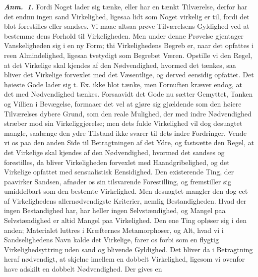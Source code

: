 \documentclass[12pt]{book}
\newcommand{\anm}[1]{\emph{\textbf{Anm.~#1.}}}
\newcommand{\opage}[1]{\marginnote{\footnotesize\textit{[#1]}}}
\begin{document}
\anm{1} Fordi Noget lader sig tænke, eller har en tænkt Tilværelse, derfor har det
endnu ingen sand Virkelighed, ligesaa lidt som Noget virkelig er til, fordi det blot
forestilles eller sandses. Vi maae altsaa prøve Tilværelsens Gyldighed ved at bestemme
dens Forhold til Virkeligheden. Men under denne Prøvelse gjentager Vanskeligheden sig i
en ny Form; thi Virkelighedens Begreb er, naar det opfattes i reen Almindelighed,
ligesaa tvetydigt som Begrebet Væren. Opstille vi den Regel, at det Virkelige skal
kjendes af den Nødvendighed, hvormed det tænkes, saa bliver det Virkelige forvexlet med
det Væsentlige, og derved eensidig opfattet.
\opage{161} %
Det høieste Gode lader sig t. Ex. ikke blot tænke, men Fornuften kræver endog, at det
med Nødvendighed tænkes. Forsaavidt det Gode nu sætter Gemyttet, Tanken og Villien i
Bevægelse, formaaer det vel at gjøre sig gjældende som den høiere Tilværelses dybere
Grund, som den reale Mulighed, der med indre Nødvendighed stræber mod sin
Virkeliggjørelse; men dets fulde Virkelighed vil dog desuagtet mangle, saalænge den
ydre Tilstand ikke svarer til dets indre Fordringer. Vende vi os paa den anden Side til
Betragtningen af det Ydre, og fastsætte den Regel, at det Virkelige skal kjendes af den
Nødvendighed, hvormed det sandses og forestilles, da bliver Virkeligheden forvexlet med
Haandgribelighed, og det Virkelige opfattet med sensualistisk Eensidighed. Den
existerende Ting, der paavirker Sandsen, afnøder os sin tilsvarende Forestilling, og
fremstiller sig umiddelbart som den bestemte Virkelighed. Men desuagtet mangler den dog
eet af Virkelighedens allernødvendigste Kriterier, nemlig Bestandigheden. Hvad der
ingen Bestandighed har, har heller ingen Selvstændighed, og Mangel paa Selvstændighed
er altid Mangel paa Virkelighed. Den ene Ting opløser sig i den anden; Materialet
luttres i Kræfternes Metamorphoser, og Alt, hvad vi i Sandselighedens Navn kalde det
Virkelige, farer os forbi som en flygtig Virkelighedsyttring uden sand og blivende
Gyldighed. Det bliver da i Betragtning heraf nødvendigt, at skjelne imellem en dobbelt
Virkelighed, ligesom vi ovenfor have adskilt en dobbelt Nødvendighed. Der gives en
\end{document}
